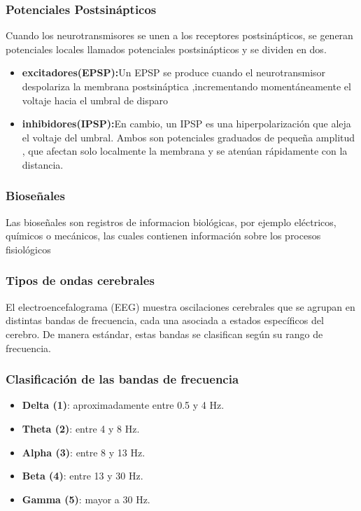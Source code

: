 \documentclass[12pt,letterpaper]{article}
\begin{document}
\subsubsection{Potenciales Postsinápticos}
Cuando los neurotransmisores se unen a los receptores postsinápticos, se generan potenciales locales llamados potenciales postsinápticos y se dividen en dos.
\cite{noauthor_synaptic_nodate}
\begin{itemize}
    \item \textbf{excitadores(EPSP):}Un EPSP se produce cuando el neurotransmisor despolariza la membrana postsináptica ,incrementando momentáneamente el voltaje hacia el umbral de disparo\cite{noauthor_synaptic_nodate}
    \item \textbf{inhibidores(IPSP):}En cambio, un IPSP es una hiperpolarización  que aleja el voltaje del umbral. Ambos son
potenciales graduados de pequeña amplitud , que afectan solo localmente la membrana y se atenúan rápidamente con la distancia.\cite{noauthor_synaptic_nodate}
\end{itemize}

\subsubsection{Bioseñales}

Las bioseñales son registros de informacion biológicas, por ejemplo eléctricos, químicos o mecánicos, las cuales contienen información sobre los procesos fisiológicos \cite{bayat_comprehensive_2026}

\subsubsection{Tipos de ondas cerebrales}

El electroencefalograma (EEG) muestra oscilaciones cerebrales que se agrupan en distintas bandas de frecuencia, cada una asociada a estados específicos del cerebro. De manera estándar, estas bandas se clasifican según su rango de frecuencia.\cite{nunez_electroencephalography_2017}

\subsubsection{Clasificación de las bandas de frecuencia}

\begin{itemize}
    \item \textbf{Delta (1)}: aproximadamente entre 0.5 y 4 Hz.
    \item \textbf{Theta (2)}: entre 4 y 8 Hz.
    \item \textbf{Alpha (3)}: entre 8 y 13 Hz.
    \item \textbf{Beta (4)}: entre 13 y 30 Hz.
    \item \textbf{Gamma (5)}: mayor a 30 Hz.
\end{itemize}
\end{document}
